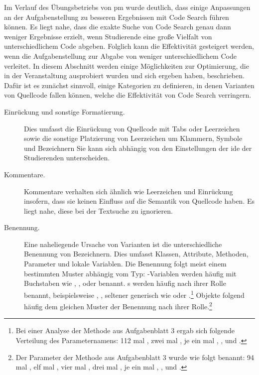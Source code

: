 Im Verlauf des Übungsbetriebs von \ac{pm} wurde deutlich, dass einige Anpassungen an der Aufgabenstellung zu besseren Ergebnissen mit Code Search führen können.
Es liegt nahe, dass die exakte Suche von Code Search genau dann weniger Ergebnisse erzielt, wenn Studierende eine große Vielfalt von unterschiedlichem Code abgeben.
Folglich kann die Effektivität gesteigert werden, wenn die Aufgabenstellung zur Abgabe von weniger unterschiedlichem Code verleitet.
In diesem Abschnitt werden einige Möglichkeiten zur Optimierung, die in der Veranstaltung ausprobiert wurden und sich ergeben haben, beschrieben.
Dafür ist es zunächst sinnvoll, einige Kategorien zu definieren, in denen Varianten von Quellcode fallen können, welche die Effektivität von Code Search verringern.

\begin{description}
    \item[Einrückung und sonstige Formatierung.]
    Dies umfasst die Einrückung von Quellcode mit Tabs oder Leerzeichen sowie die sonstige Platzierung von Leerzeichen um Klammern, Symbole und Bezeichnern
    Sie kann sich abhängig von den Einstellungen der \ac{ide} der Studierenden unterscheiden.
    \item[Kommentare.]
    Kommentare verhalten sich ähnlich wie Leerzeichen und Einrückung insofern, dass sie keinen Einfluss auf die Semantik von Quellcode haben.
    Es liegt nahe, diese bei der Textsuche zu ignorieren.
    \item[Benennung.]
    Eine naheliegende Ursache von Varianten ist die unterschiedliche Benennung von Bezeichnern.
    Dies umfasst Klassen, Attribute, Methoden, Parameter und lokale Variablen.
    Die Benennung folgt meist einem bestimmten Muster abhängig vom Typ:
    -Variablen werden häufig mit Buchstaben wie , ,  oder  benannt.
    s werden häufig nach ihrer Rolle benannt, beispielsweise , , seltener generisch wie  oder .\footnote{
        Bei einer Analyse der Methode  aus Aufgabenblatt 3 ergab sich folgende Verteilung des Parameternamens:
        112 mal , zwei mal , je ein mal , \sic,  und .\label{fn:setPhase}
    }
    Objekte folgend häufig dem gleichen Muster der Benennung nach ihrer Rolle.\footnote{
        Der Parameter der Methode  aus Aufgabenblatt 3 wurde wie folgt benannt:
        94 mal , elf mal , vier mal , drei mal , je ein mal , , \sic und .\label{fn:setWinner}
}
\end{description}
